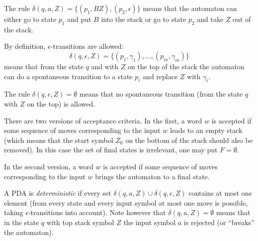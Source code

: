 \begin{page}
\setcounter{section}{6}
\setcounter{subsection}{1}
\setcounter{dfn}{2}
\label{portion:1251}

\begin{exl}
The rule $\delta(q, a, Z) = \{(p_1, BZ), (p_2, \epsilon)\}$ means that the automaton can either go to state $p_1$ and put $B$ into the stack
or go to state $p_2$ and take $Z$ out of the stack.
\end{exl}

\end{page}

\begin{page}
\setcounter{section}{6}
\setcounter{subsection}{1}
\setcounter{dfn}{2}
\label{portion:1252}


By definition, $\epsilon$-transitions are allowed:
\[
\delta(q, \epsilon, Z) = \{(p_1, \gamma_1), \ldots, (p_m, \gamma_m)\}
\]
means that from the state $q$ and with $Z$ on the top of the stack the automaton can do a spontaneous transition
to a state $p_i$ and replace $Z$ with $\gamma_i$.


\end{page}

\begin{page}
\setcounter{section}{6}
\setcounter{subsection}{1}
\setcounter{dfn}{3}
\label{portion:1254}

\begin{exl}
The rule $\delta(q, \epsilon, Z) = \emptyset$ means that no spontaneous transition (from the state $q$ with $Z$ on the top) is allowed.
\end{exl}

\end{page}

\begin{page}
\setcounter{section}{6}
\setcounter{subsection}{1}
\setcounter{dfn}{3}
\label{portion:1255}


There are two versions of acceptance criteria.
In the first, a word $w$ is accepted if some sequence of moves corresponding to the input $w$ leads to an empty stack
(which means that the start symbol $Z_0$ on the bottom of the stack should also be removed).
In this case the set of final states is irrelevant, one may put $F = \emptyset$.

In the second version, a word $w$ is accepted if some sequence of moves corresponding to the input $w$ brings the automaton to a final state.

A PDA is \emph{deterministic} if every set $\delta(q, a, Z) \cup \delta(q, \epsilon, Z)$ contains at most one element
(from every state and every input symbol at most one move is possible, taking $\epsilon$-transitions into account).
Note however that $\delta(q, a, Z) = \emptyset$ means that in the state $q$ with top stack symbol $Z$
the input symbol $a$ is rejected (or ``breaks'' the automaton).


\end{page}

